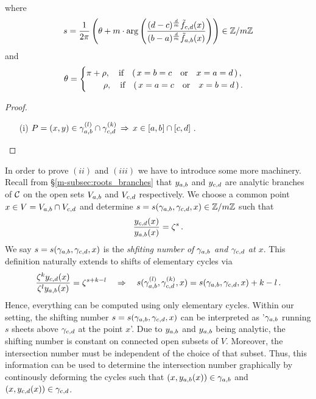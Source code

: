 \documentclass[main.tex]{subfiles}
\begin{document}
\begin{thm}
\begin{itemize}
\begin{align*}
       \end{align*}
       where  
       \begin{align*}
       s = \frac{1}{2\pi} \left( \theta +  m \cdot \arg \left( \frac{(d-c)^{\frac{d}{m}} \tilde{f}_{c,d}(x)}{(b-a)^{\frac{d}{m}} \tilde{f}_{a,b}(x)} \right) \right) \in \mathbb{Z}/m\mathbb{Z}
       \end{align*}
       and 
       \begin{align*}
        \theta = \begin{cases}
                              \pi+\rho, \quad \text{if} \quad (\,x = b = c \quad \text{or} \quad x = a = d\,)\,,\\
                              \hspace{0.7cm} \rho, \quad \text{if} \quad (\,x = a = c \quad \text{or} \quad x = b = d\,)\,.
                             \end{cases}
       \end{align*}
      \end{itemize}
 \end{thm}

  \begin{proof}\let\qed\relax
   \begin{itemize}
    \item[(i)] $P = (x,y) \in \gamma_{a,b}^{(l)} \cap \gamma_{c,d}^{(k)} \,  \Rightarrow \, x \in [a,b] \cap [c,d]$\,.
   \end{itemize}
  \end{proof}
  
  In order to prove $(ii)$ and $(iii)$ we have to introduce some more machinery. Recall from \S \ref{m-subsec:roots_branches} that $y_{a,b}$ and $y_{c,d}$ are analytic branches of $\mathcal{C}$ on the open sets
  $V_{a,b}$ and $V_{c,d}$ respectively. \abstandl
  We choose a common point $x \in V = V_{a,b} \cap V_{c,d}$ and determine $s  = s(\gamma_{a,b},\gamma_{c,d},x) \in \mathbb{Z}/m\mathbb{Z}$  such that
  \begin{align}
	  \frac{y_{c,d}(x)}{y_{a,b}(x)} = \zeta^s \,.
  \end{align}
  We say $s  = s(\gamma_{a,b},\gamma_{c,d},x)$ is the \emph{shfiting number of $\gamma_{a,b}$ and $\gamma_{c,d}$ at $x$}.
  This definition naturally extends to shifts of elementary cycles via
\begin{align}
	 \frac{\zeta^ky_{c,d}(x)}{\zeta^ly_{a,b}(x)} = \zeta^{s+k-l} \quad \Rightarrow \quad s(\gamma_{a,b}^{(l)},\gamma_{c,d}^{(k)},x) = s(\gamma_{a,b},\gamma_{c,d},x) + k - l\,.
\end{align}
	Hence, everything can be computed using only elementary cycles. \abstandl
	Within our setting, the shifting number $s=s(\gamma_{a,b},\gamma_{c,d},x)$  can be interpreted as '$\gamma_{a,b}$ running $s$ sheets above $\gamma_{c,d}$ at the point $x$'. 
	Due to $y_{a,b}$ and $y_{a,b}$ being analytic, the shifting number is constant on connected open subsets of $V$. Moreover, the intersection number must be independent of the choice of that subset. \abstandl
	Thus,
	this information can be used to determine
	the intersection number graphically by continously deforming the cycles such that $(x,y_{a,b}(x)) \in \gamma_{a,b}$ and $(x,y_{c,d}(x)) \in \gamma_{c,d}$.
	
\end{document}
